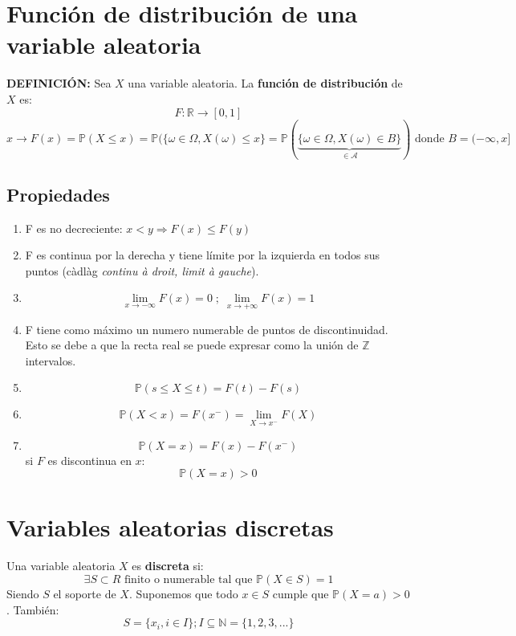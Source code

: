 \documentclass[11pt]{article}
\newcommand{\N}{\mathbb{N}}
\newcommand{\R}{\mathbb{R}}
\newcommand{\prob}{\mathbb{P}}
\newcommand{\omg}{\omega}
\newcommand{\OMG}{\varOmega}
\theoremstyle{plain}
\begin{document}
    \section{Función de distribución de una variable aleatoria} %
    \label{sec:función_de_distribución_de_una_variable_aleatoria}
    \textbf{DEFINICIÓN:} Sea $X$ una variable aleatoria. La \textbf{función de distribución} de $X$ es:
    \[F:\R \rightarrow [0,1]\]
    \[x \rightarrow F(x) = \prob(X\le x) = \prob(\{\omg \in \OMG, X(\omg) \le x\} = \prob(\underbrace{\{\omg \in \OMG, X(\omg) \in B\}}_{\in \mathcal{A}}) \text{ donde }B = (-\infty,x]\]
    \subsection{Propiedades} %
    \label{sub:propiedades}
        \begin{enumerate}
            \item F es no decreciente: $x<y \Rightarrow F(x) \le F(y)$
            \item F es continua por la derecha y tiene límite por la izquierda en todos sus puntos (càdlàg \textit{continu à droit, limit à gauche}).
            \item \[\lim_{x\to-\infty}F(x) = 0\;;\;\lim_{x\to+\infty}F(x) = 1\]
            \item F tiene como máximo un numero numerable de puntos de discontinuidad. Esto se debe a que la recta real se puede expresar como la unión de $\mathbb{Z}$ intervalos.
            \item \[\prob(s\le X \le t) = F(t) - F(s)\]
            \item \[\prob(X < x) = F(x^-) = \lim_{X\to x^-}F(X)\]
            \item \[\prob(X=x) = F(x) - F(x^-)\]
            si $F$ es discontinua en $x$:
                \[\prob(X=x) > 0\]
        \end{enumerate}
    \section{Variables aleatorias discretas} %
    \label{sec:variables_aleatorias_discretas}
        Una variable aleatoria $X$ es \textbf{discreta} si:
        \[\exists S \subset R \text{ finito o numerable tal que } \prob(X\in S) = 1\]
        Siendo $S$ el soporte de $X$. Suponemos que todo $x\in S$ cumple que $\prob(X=a) > 0$. También:
        \[S = \{x_i, i\in I\} ; I\subseteq \N = \{1,2,3,...\}\]
\end{document}
